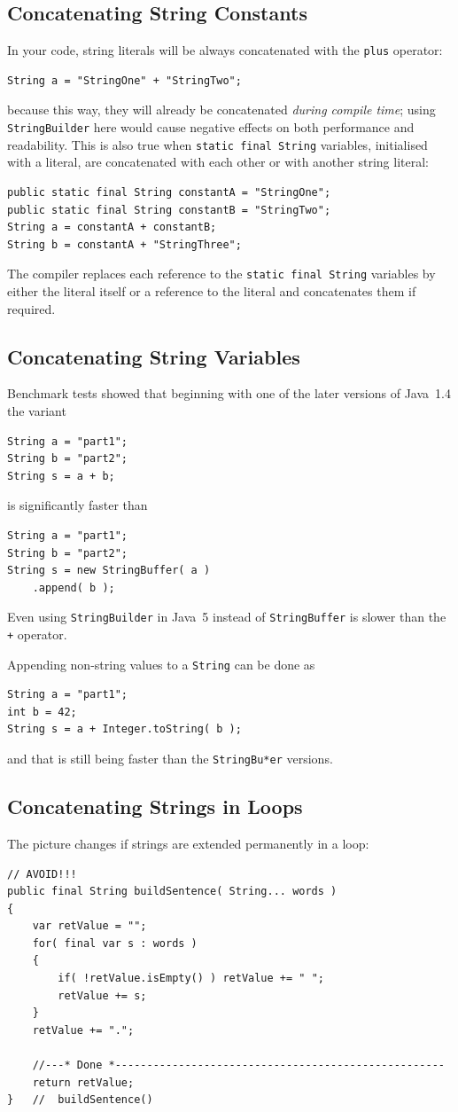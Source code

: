 \documentclass[11pt,a4paper, titlepage, parskip=half, headsepline, footsepline, cleardoublepage=current, headheight=1cm]{scrbook}
\begin{document}
\subsection{Concatenating String Constants}
In your code, string literals will be always concatenated with the \verb#plus# operator:
\begin{lstlisting}
String a = "StringOne" + "StringTwo";
\end{lstlisting}
because this way, they will already be concatenated \textit{during compile time}; using \lstinline|StringBuilder| here would cause negative effects on both performance and readability. This is also true when \lstinline|static final String| variables, initialised with a literal, are concatenated with each other or with another string literal:
\begin{lstlisting}
public static final String constantA = "StringOne";
public static final String constantB = "StringTwo";
String a = constantA + constantB;
String b = constantA + "StringThree";
\end{lstlisting}
The compiler replaces each reference to the \lstinline|static final String| variables by either the literal itself or a reference to the literal and concatenates them if required.

\subsection{Concatenating String Variables}
Benchmark tests showed that beginning with one of the later versions of Java~1.4 the variant
\begin{lstlisting}
String a = "part1";
String b = "part2";
String s = a + b;
\end{lstlisting}
is significantly faster than
\begin{lstlisting}
String a = "part1";
String b = "part2";
String s = new StringBuffer( a )
    .append( b );
\end{lstlisting}
Even using \lstinline|StringBuilder| in Java~5 instead of \lstinline|StringBuffer| is slower than the \verb#+# operator.

Appending non-string values to a \lstinline|String| can be done as
\begin{lstlisting}
String a = "part1";
int b = 42;
String s = a + Integer.toString( b );
\end{lstlisting}
and that is still being faster than the \lstinline|StringBu*er| versions.

\subsection{Concatenating Strings in Loops}
The picture changes if strings are extended permanently in a loop:
\begin{lstlisting}
// AVOID!!!
public final String buildSentence( String... words )
{
    var retValue = "";
    for( final var s : words )
    {
        if( !retValue.isEmpty() ) retValue += " ";
        retValue += s;
    }
    retValue += ".";
    
    //---* Done *----------------------------------------------------
    return retValue;
}   //  buildSentence()
\end{lstlisting}
\end{document}
